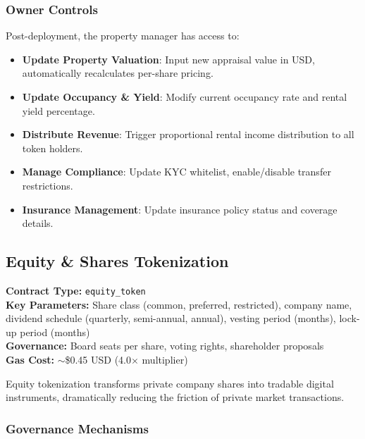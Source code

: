 \documentclass[11pt,a4paper,twoside]{article}
\begin{document}
\subsubsection{Owner Controls}

Post-deployment, the property manager has access to:
\begin{itemize}
  \item \textbf{Update Property Valuation}: Input new appraisal value in USD, automatically recalculates per-share pricing.
  \item \textbf{Update Occupancy \& Yield}: Modify current occupancy rate and rental yield percentage.
  \item \textbf{Distribute Revenue}: Trigger proportional rental income distribution to all token holders.
  \item \textbf{Manage Compliance}: Update KYC whitelist, enable/disable transfer restrictions.
  \item \textbf{Insurance Management}: Update insurance policy status and coverage details.
\end{itemize}

\subsection{Equity \& Shares Tokenization}
\label{subsec:equity}

\begin{keyinsight}
\textbf{Contract Type:} \texttt{equity\_token}\\
\textbf{Key Parameters:} Share class (common, preferred, restricted), company name, dividend schedule (quarterly, semi-annual, annual), vesting period (months), lock-up period (months)\\
\textbf{Governance:} Board seats per share, voting rights, shareholder proposals\\
\textbf{Gas Cost:} $\sim$\$0.45 USD (4.0$\times$ multiplier)
\end{keyinsight}

Equity tokenization transforms private company shares into tradable digital instruments, dramatically reducing the friction of private market transactions.

\subsubsection{Governance Mechanisms}
\end{document}
